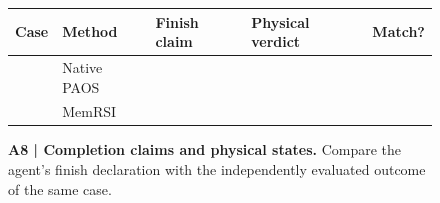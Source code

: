 \begin{figure}[t]
\centering
{}
\vspace{0.6em}
{\small
\setlength{\tabcolsep}{8pt}
\renewcommand{\arraystretch}{1.14}
\begin{tabular}{@{}llllc@{}}
\toprule
\rowcolor{cvprblue!8}
\textbf{Case}
& \textbf{Method}
& \textbf{Finish claim}
& \textbf{Physical verdict}
& \textbf{Match?} \\
\midrule
& Native PAOS & & & \\
\rowcolor{red!5}
& MemRSI & & & \\
\bottomrule
\end{tabular}
}
\caption{\textbf{A8 | Completion claims and physical states.}
Compare the agent's finish declaration with the
independently evaluated outcome of the same case.}
\label{fig:A8_physical_verification}
\end{figure}
